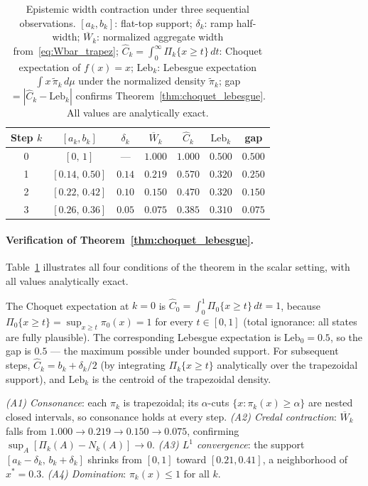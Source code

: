 \documentclass[12pt]{article}
\begin{document}
\begin{table}[ht]
\centering
\caption{Epistemic width contraction under three sequential observations.
$[a_k,b_k]$: flat-top support; $\delta_k$: ramp half-width;
$\overline{W}_k$: normalized aggregate width from~\eqref{eq:Wbar_trapez};
$\widehat{C}_k = \int_0^\infty \Pi_k\{x\ge t\}\,dt$: Choquet expectation of $f(x)=x$;
$\mathrm{Leb}_k$: Lebesgue expectation $\int x\,\tilde\pi_k\,d\mu$
under the normalized density $\tilde\pi_k$;
gap $= |\widehat{C}_k - \mathrm{Leb}_k|$ confirms Theorem~\ref{thm:choquet_lebesgue}.
All values are analytically exact.}
\label{tab:scalar}
\renewcommand{\arraystretch}{1.3}
\begin{tabular}{@{}ccccccc@{}}
\toprule
Step $k$ & $[a_k, b_k]$ & $\delta_k$ & $\overline{W}_k$ & $\widehat{C}_k$ & $\mathrm{Leb}_k$ & gap \\
\midrule
0 & $[0,\,1]$        & ---    & $1.000$ & $1.000$ & $0.500$ & $0.500$ \\
1 & $[0.14,\,0.50]$  & $0.14$ & $0.219$ & $0.570$ & $0.320$ & $0.250$ \\
2 & $[0.22,\,0.42]$  & $0.10$ & $0.150$ & $0.470$ & $0.320$ & $0.150$ \\
3 & $[0.26,\,0.36]$  & $0.05$ & $0.075$ & $0.385$ & $0.310$ & $0.075$ \\
\bottomrule
\end{tabular}
\end{table}

\paragraph{Verification of Theorem~\ref{thm:choquet_lebesgue}.}
Table~\ref{tab:scalar} illustrates all four conditions of the theorem in the
scalar setting, with all values analytically exact.

The Choquet expectation at $k=0$ is $\widehat{C}_0 = \int_0^1\Pi_0\{x\ge t\}\,dt = 1$,
because $\Pi_0\{x\ge t\}=\sup_{x\ge t}\pi_0(x)=1$ for every $t\in[0,1]$
(total ignorance: all states are fully plausible).
The corresponding Lebesgue expectation is $\mathrm{Leb}_0=0.5$,
so the gap is $0.5$ --- the maximum possible under bounded support.
For subsequent steps, $\widehat{C}_k = b_k + \delta_k/2$
(by integrating $\Pi_k\{x\ge t\}$ analytically over the trapezoidal support),
and $\mathrm{Leb}_k$ is the centroid of the trapezoidal density.

\emph{(A1) Consonance}: each $\pi_k$ is trapezoidal; its $\alpha$-cuts
$\{x:\pi_k(x)\ge\alpha\}$ are nested closed intervals, so consonance holds at every step.
\emph{(A2) Credal contraction}: $\overline{W}_k$ falls from $1.000\to 0.219\to 0.150\to 0.075$,
confirming $\sup_A[\Pi_k(A)-N_k(A)]\to 0$.
\emph{(A3) $L^1$ convergence}: the support $[a_k-\delta_k,\,b_k+\delta_k]$ shrinks
from $[0,1]$ toward $[0.21,0.41]$, a neighborhood of $x^*=0.3$.
\emph{(A4) Domination}: $\pi_k(x)\le 1$ for all $k$.
\end{document}
